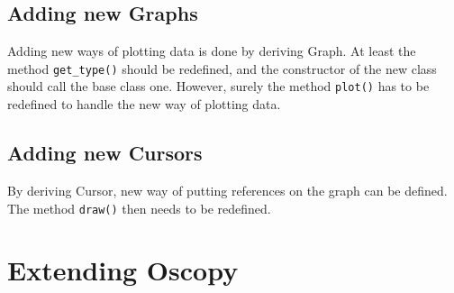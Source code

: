 \documentclass[a4paper,11pt]{article}
\newcommand{\meth}[1]{\texttt{#1()}}
\newcommand{\cls}[1]{\textsf{#1}}
\newcommand{\graph}{\cls{Graph}}
\newcommand{\cursor}{\cls{Cursor}}
\begin{document}
\subsection{Adding new Graphs}
Adding new ways of plotting data is done by deriving \graph.
At least the method \meth{get\_type} should be redefined, and the constructor of the new class should call the base class one.
However, surely the method \meth{plot} has to be redefined to handle the new way of plotting data.

\subsection{Adding new Cursors}
By deriving \cursor, new way of putting references on the graph can be defined.
The method \meth{draw} then needs to be redefined.



\section{Extending Oscopy}
\label{sec:ext}
\end{document}
